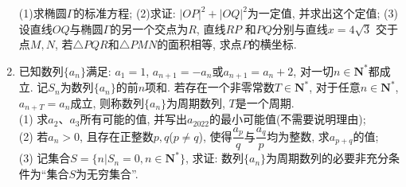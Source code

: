 \documentclass[10pt,a4paper]{article}
\begin{document}
\begin{enumerate}[1.]
\begin{center}
\end{center}
(1)求椭圆$\Gamma$的标准方程;
(2)求证: ${{| OP |}^2}+{{| OQ |}^2}$为一定值, 并求出这个定值;
(3)设直线$OQ$与椭圆$\Gamma$的另一个交点为$R$, 直线$RP$ 和$PQ$分别与直线$x=4\sqrt 3$ 交于点$M,N$, 若$\triangle PQR$和$\triangle PMN$的面积相等, 求点$P$的横坐标.
\item 已知数列$\{a_n\}$满足: $a_1=1$, $a_{n+1}=-a_n$或$a_{n+1}=a_n+2$, 对一切$n\in \mathbf{N}^*$都成立. 记$S_n$为数列$\{a_n\}$的前$n$项和. 若存在一个非零常数$T\in \mathbf{N}^*$, 对于任意$n\in \mathbf{N}^*$, $a_{n+T}={a_n}$成立, 则称数列$\{a_n\}$为周期数列, $T$是一个周期.\\
(1) 求$a_2$、$a_3$所有可能的值, 并写出$a_{2022}$的最小可能值(不需要说明理由);\\
(2) 若$a_n>0$, 且存在正整数$p,q$($p\ne q$), 使得$\dfrac{a_p}q$与$\dfrac{a_q}p$均为整数, 求$a_{p+q}$的值;\\
(3) 记集合$S=\{n|S_n=0,n\in \mathbf{N}^*\}$, 求证: 数列$\{a_n\}$为周期数列的必要非充分条件为``集合$S$为无穷集合''.

\end{enumerate}
\end{document}
